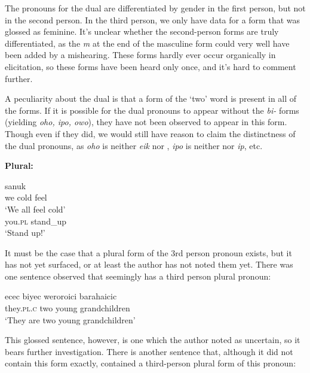 \documentclass[pdftex,12pt,letterpaper]{article}
\let\ipa\textipa
\begin{document}
 \noindent The pronouns for the dual are differentiated by gender in the first person, but not in the second person. In the third person, we only have data for a form that was glossed as feminine. It's unclear whether the second-person forms are truly differentiated, as the \emph{m} at the end of the masculine form could very well have been added by a mishearing. These forms hardly ever occur organically in elicitation, so these forms have been heard only once, and it's hard to comment further.
 
 A peculiarity about the dual is that a form of the `two' word is present in all of the forms. If it is possible for the dual pronouns to appear without the \emph{bi-} forms (yielding \emph{oho, ipo, owo}), they have not been observed to appear in this form. Though even if they did, we would still have reason to claim the distinctness of the dual pronouns, as \emph{oho} is neither \emph{eik} nor \emph{\ipa{@p@}}, \emph{ipo} is neither \emph{\ipa{\textltailn@k}} nor \emph{ip\ipa{@}}, etc.

 \noindent\textbf{Plural:}

 \begin{minipage}{\textwidth}
 \begin{exe}
 \ex
 \gll \ipa{@p@} \ipa{\textltailn uman@g@s} sanuk \\
 we cold feel \\
 \trans `We all feel cold'
 \ex
 \gll \ipa{ip@} \ipa{kitay@tu} \\
 you.\textsc{pl} stand\_up \\
 \trans `Stand up!'
 \end{exe}
 \vspace{10pt}
 \end{minipage}

 \noindent It must be the case that a plural form of the 3rd person pronoun exists, but it has not yet surfaced, or at least the author has not noted them yet. There was one sentence observed that seemingly has a third person plural pronoun:
 
 \begin{exe}
 \ex 
 \gll ecec biyec weroroici barahaicic \\
 they.\textsc{pl}.\textsc{c} two young grandchildren \\
 \trans `They are two young grandchildren'
 \end{exe}
 
\noindent This glossed sentence, however, is one which the author noted as uncertain, so it bears further investigation. There is another sentence that, although it did not contain this form exactly, contained a third-person plural form of this pronoun:
 
\end{document}
